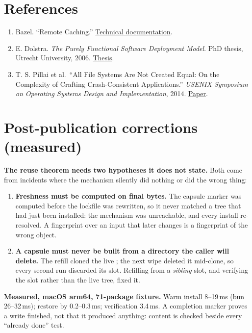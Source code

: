 \documentclass[
  11pt,
  letterpaper,
]{article}
\providecommand{\tightlist}{%
  \setlength{\itemsep}{0pt}\setlength{\parskip}{0pt}}
\begin{document}
\section*{References}\label{references}

\begin{enumerate}
\def\labelenumi{\arabic{enumi}.}
\tightlist
\item
  Bazel. ``Remote Caching.''
  \href{https://bazel.build/remote/caching}{Technical documentation}.
\item
  E. Dolstra. \emph{The Purely Functional Software Deployment Model}.
  PhD thesis, Utrecht University, 2006.
  \href{https://nixos.org/~eelco/pubs/phd-thesis.pdf}{Thesis}.
\item
  T. S. Pillai et al.~``All File Systems Are Not Created Equal: On the
  Complexity of Crafting Crash-Consistent Applications.'' \emph{USENIX
  Symposium on Operating Systems Design and Implementation}, 2014.
  \href{https://www.usenix.org/conference/osdi14/technical-sessions/presentation/pillai}{Paper}.
\end{enumerate}


\section*{Post-publication corrections (measured)}

\textbf{The reuse theorem needs two hypotheses it does not state.} Both come from incidents where
the mechanism silently did nothing or did the wrong thing:

\begin{enumerate}
\item \textbf{Freshness must be computed on final bytes.} The capsule marker was computed before the
lockfile was rewritten, so it never matched a tree that had just been installed: the mechanism was
unreachable, and every install re-resolved. A fingerprint over an input that later changes is a
fingerprint of the wrong object.
\item \textbf{A capsule must never be built from a directory the caller will delete.} The refill
cloned the live ; the next wipe deleted it mid-clone, so every second run
discarded its slot. Refilling from a \emph{sibling} slot, and verifying the slot rather than the
live tree, fixed it.
\end{enumerate}

\textbf{Measured, macOS arm64, 71-package fixture.} Warm install 8--19\,ms (bun 26--32\,ms);
restore by  0.2--0.3\,ms; verification 3.4\,ms. A completion marker proves a write
finished, not that it produced anything: content is checked beside every ``already done'' test.
\end{document}
